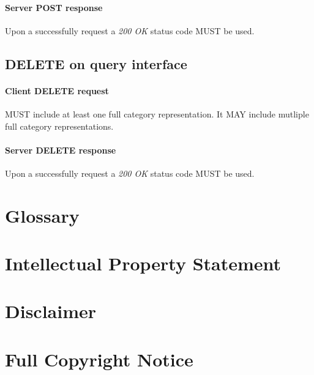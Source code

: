 \documentclass[10pt,a4paper]{article}
\begin{document}
\paragraph{Server POST response}
Upon a successfully request a \emph{200 OK} status code MUST be used.

\subsection{DELETE on query interface}

\paragraph{Client DELETE request}
MUST include at least one full category representation. It MAY include mutliple full category representations.

\paragraph{Server DELETE response}
Upon a successfully request a \emph{200 OK} status code MUST be used.

\section{Glossary}
\label{sec:glossary}


%

\section{Intellectual Property Statement}


\section{Disclaimer}


\section{Full Copyright Notice}




\end{document}
